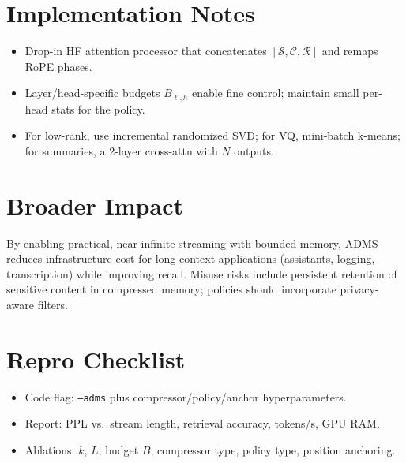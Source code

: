 \documentclass[11pt]{article}
\newcommand{\model}{\textsc{ADMS}} %
\newcommand{\sink}{\mathcal{S}}
\newcommand{\recent}{\mathcal{R}}
\newcommand{\compressed}{\mathcal{C}}
\begin{document}
\section{Implementation Notes}
\begin{itemize}
  \item Drop-in HF attention processor that concatenates $[\sink, \compressed, \recent]$ and remaps RoPE phases.
  \item Layer/head-specific budgets $B_{\ell,h}$ enable fine control; maintain small per-head stats for the policy.
  \item For low-rank, use incremental randomized SVD; for VQ, mini-batch k-means; for summaries, a 2-layer cross-attn with $N$ outputs.
\end{itemize}

\section{Broader Impact}
By enabling practical, near-infinite streaming with bounded memory, \model{} reduces infrastructure cost for long-context applications (assistants, logging, transcription) while improving recall. Misuse risks include persistent retention of sensitive content in compressed memory; policies should incorporate privacy-aware filters.

\section*{Repro Checklist}
\begin{itemize}
  \item Code flag: \texttt{--adms} plus compressor/policy/anchor hyperparameters.
  \item Report: PPL vs.\ stream length, retrieval accuracy, tokens/s, GPU RAM.
  \item Ablations: $k$, $L$, budget $B$, compressor type, policy type, position anchoring.
\end{itemize}
\end{document}
